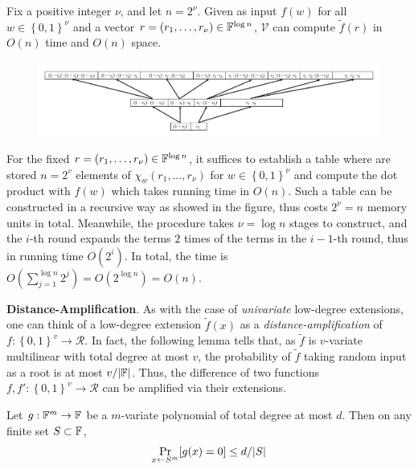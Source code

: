 \documentclass{article}
\begin{document}
\begin{lemma} \label{lem:evaluate-MLE}
Fix a positive integer $\nu$, and let $n = 2^{\nu}$. Given as input $f(w)$ for all $w \in \left\{ 0, 1 \right\}^{\nu}$ and a vector $r = (r_1, \dots, r_{\nu}) \in \mathbb{F}^{\log n}$, $\mathcal{V}$ can compute $\tilde{f}(r)$ in $O(n)$ time and $O(n)$ space. 
\end{lemma}

\begin{figure}[h]
\centering
\includegraphics[scale=0.4]{eval_mle}
\end{figure}

For the fixed $r = (r_1, \dots, r_{\nu}) \in \mathbb{F}^{\log n}$, it suffices to establish a table where are stored $n = 2^{v}$ elements of $ \chi_{w}(r_1, \dots, r_{\nu})$ for $w \in \left\{ 0, 1 \right\}^{\nu}$ and compute the dot product with $f(w)$ which takes running time in $O(n)$. Such a table can be constructed in a recursive way as showed in the figure, thus costs $2^{\nu} = n$ memory units in total. Meanwhile, the procedure takes $\nu = \log n$ stages to construct, and the $i$-th round expands the terms $2$ times of the terms in the $i-1$-th round, thus in running time $O(2^i)$. In total, the time is $O(\sum_{j = 1}^{\log n}2^j) =O(2^{\log n}) = O(n)$.

\textbf{Distance-Amplification}. As with the case of \textit{univariate} low-degree extensions, one can think of a low-degree extension $\widetilde{f}(x)$ as a \textit{distance-amplification} of $f: \left\{ 0, 1 \right\}^v \rightarrow \mathcal{R}$. In fact, the following lemma tells that, as $\widetilde{f}$ is $v$-variate multilinear with total degree at most $v$, the probability of $\widetilde{f}$ taking random input as a root is at most $v / \abs{\mathbb{F}}$. Thus, the difference of two functions $f, f': \left\{ 0, 1 \right\}^v \rightarrow \mathcal{R}$ can be amplified via their extensions.

\begin{lemma} \label{lem:multivariate-root-portion}
Let $g: \mathbb{F}^m \rightarrow \mathbb{F}$ be a $m$-variate polynomial of total degree at most $d$. Then on any finite set $S \subset \mathbb{F}$, 
\begin{equation*}
\mathop{\operatorname{Pr}}_{x \leftarrow S^m} [g(x) = 0] \leq d/|S|
\end{equation*}
\end{lemma}
\end{document}
